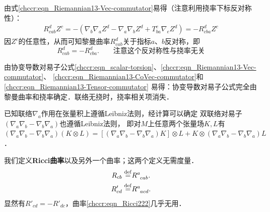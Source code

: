 由式\eqref{chccr:eqn_Riemannian13-Vec-commutator}易得（注意利用挠率下标反对称性）：
\begin{align*}
	R_{cab}^d Z^c =- \left(\nabla_b \nabla_a Z^d -\nabla_a \nabla_b Z^d 
	+T_{ba}^e \nabla_e Z^d \right)	=-R_{cba}^d Z^c 
\end{align*}
因$Z^c$的任意性，从而可知黎曼曲率$R_{cab}^d$关于指标$a$、$b$反对称，即
\begin{equation}\label{chccr:eqn_Rab=-Rba}
    R_{cab}^d= -R_{cba}^d . \qquad \text{注意这个反对称性与挠率无关}
\end{equation}


\begin{remark}
    由协变导数对易子公式\eqref{chccr:eqn_scalar-torsion}、\eqref{chccr:eqn_Riemannian13-Vec-commutator}、
    \eqref{chccr:eqn_Riemannian13-CoVec-commutator}和\eqref{chccr:eqn_Riemannian13-Tensor-commutator}
    易得：协变导数对易子公式完全由黎曼曲率和挠率确定．联络无挠时，挠率相关项消失．
\end{remark}
\begin{remark}\label{chccr:rek_DD}
    已知联络$\nabla_a$作用在张量积上遵循Leibniz法则，经计算可以确定
    双联络对易子$(\nabla_a \nabla_b - \nabla_b \nabla_a)$也遵循Leibniz法则，
    即对$M$上任意两个张量场$K,L$有
    $(\nabla_a \nabla_b - \nabla_b \nabla_a)(K\otimes L)
    =[(\nabla_a \nabla_b - \nabla_b \nabla_a) K]\otimes  L+
    K\otimes (\nabla_a \nabla_b - \nabla_b \nabla_a) L$．
\end{remark}


我们定义{\bfseries \heiti Ricci曲率}以及另外一个曲率；这两个定义无需度量．
\begin{align}
	R_{cb} \overset{\mathrm {def}}{=}& R_{\hphantom{a} cab}^a . \label{chccr:eqn_RicciCurvatured2}\\
	R'_{cd} \overset{\mathrm {def}}{=}& R_{\hphantom{a} acd}^a . \label{chccr:eqn_Ricci222}
\end{align}
显然有$R'_{cd} = - R'_{dc}$，曲率\eqref{chccr:eqn_Ricci222}几乎无用．

